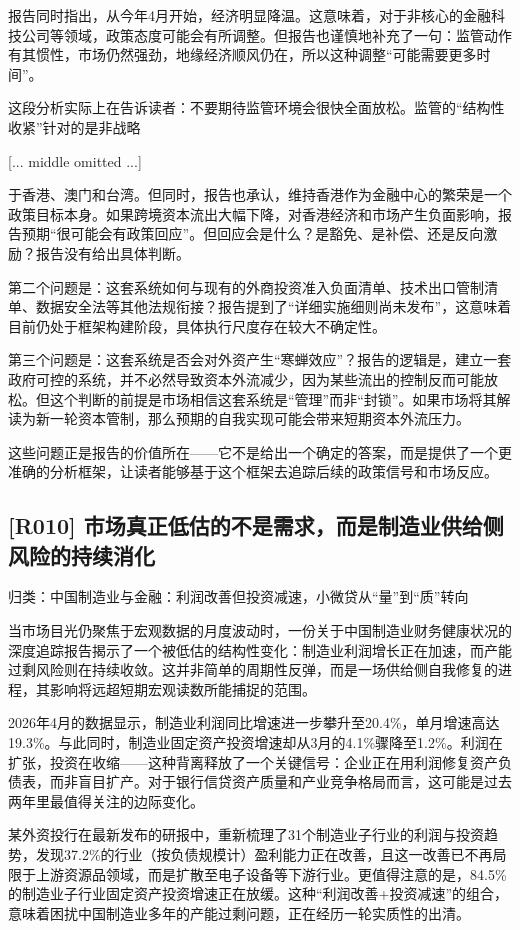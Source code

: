 \documentclass[11pt]{ctexart}
\begin{document}
报告同时指出，从今年4月开始，经济明显降温。这意味着，对于非核心的金融科技公司等领域，政策态度可能会有所调整。但报告也谨慎地补充了一句：监管动作有其惯性，市场仍然强劲，地缘经济顺风仍在，所以这种调整“可能需要更多时间”。

这段分析实际上在告诉读者：不要期待监管环境会很快全面放松。监管的“结构性收紧”针对的是非战略

[... middle omitted ...]

于香港、澳门和台湾。但同时，报告也承认，维持香港作为金融中心的繁荣是一个政策目标本身。如果跨境资本流出大幅下降，对香港经济和市场产生负面影响，报告预期“很可能会有政策回应”。但回应会是什么？是豁免、是补偿、还是反向激励？报告没有给出具体判断。

第二个问题是：这套系统如何与现有的外商投资准入负面清单、技术出口管制清单、数据安全法等其他法规衔接？报告提到了“详细实施细则尚未发布”，这意味着目前仍处于框架构建阶段，具体执行尺度存在较大不确定性。

第三个问题是：这套系统是否会对外资产生“寒蝉效应”？报告的逻辑是，建立一套政府可控的系统，并不必然导致资本外流减少，因为某些流出的控制反而可能放松。但这个判断的前提是市场相信这套系统是“管理”而非“封锁”。如果市场将其解读为新一轮资本管制，那么预期的自我实现可能会带来短期资本外流压力。

这些问题正是报告的价值所在——它不是给出一个确定的答案，而是提供了一个更准确的分析框架，让读者能够基于这个框架去追踪后续的政策信号和市场反应。

\subsection{[R010] 市场真正低估的不是需求，而是制造业供给侧风险的持续消化}
{\small\color{refgray}归类：中国制造业与金融：利润改善但投资减速，小微贷从“量”到“质”转向}

当市场目光仍聚焦于宏观数据的月度波动时，一份关于中国制造业财务健康状况的深度追踪报告揭示了一个被低估的结构性变化：制造业利润增长正在加速，而产能过剩风险则在持续收敛。这并非简单的周期性反弹，而是一场供给侧自我修复的进程，其影响将远超短期宏观读数所能捕捉的范围。

2026年4月的数据显示，制造业利润同比增速进一步攀升至20.4\%，单月增速高达19.3\%。与此同时，制造业固定资产投资增速却从3月的4.1\%骤降至1.2\%。利润在扩张，投资在收缩——这种背离释放了一个关键信号：企业正在用利润修复资产负债表，而非盲目扩产。对于银行信贷资产质量和产业竞争格局而言，这可能是过去两年里最值得关注的边际变化。

某外资投行在最新发布的研报中，重新梳理了31个制造业子行业的利润与投资趋势，发现37.2\%的行业（按负债规模计）盈利能力正在改善，且这一改善已不再局限于上游资源品领域，而是扩散至电子设备等下游行业。更值得注意的是，84.5\%的制造业子行业固定资产投资增速正在放缓。这种“利润改善+投资减速”的组合，意味着困扰中国制造业多年的产能过剩问题，正在经历一轮实质性的出清。
\end{document}
